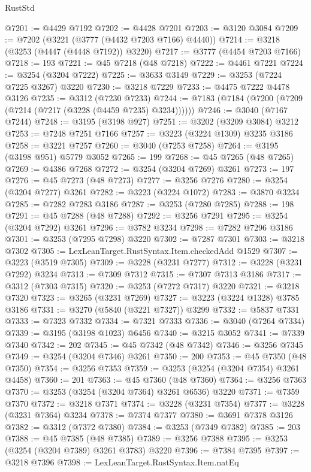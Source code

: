 \begin{lexlean}{RustStd}
\begin{coremodule}
@7201 := @4429 @7192
@7202 := @4428 @7201
@7203 := @3120 @3084
@7209 := @7202 (@3221 (@3777 (@4432 @7203 @7166) @4440))
@7214 := @3218 (@3253 (@4447 (@4448 @7192)) @3220)
@7217 := @3777 (@4454 @7203 @7166)
@7218 := 193
@7221 := @45 @7218 (@48 @7218)
@7222 := @4461 @7221
@7224 := @3254 (@3204 @7222)
@7225 := @3633 @3149
@7229 := @3253 (@7224 @7225 @3267) @3220
@7230 := @3218 @7229
@7233 := @4475 @7222 @4478 @3126
@7235 := @3312 (@7230 @7233)
@7244 := @7183 (@7184 (@7200 (@7209 (@7214 (@7217 (@3228 (@4459 @7235) @3234))))))
@7246 := @3040 (@7167 @7244)
@7248 := @3195 (@3198 @927)
@7251 := @3202 (@3209 @3084) @3212
@7253 := @7248 @7251 @7166
@7257 := @3223 (@3224 @1309) @3235 @3186
@7258 := @3221 @7257
@7260 := @3040 (@7253 @7258)
@7264 := @3195 (@3198 @951) @5779 @3052
@7265 := 199
@7268 := @45 @7265 (@48 @7265)
@7269 := @4386 @7268
@7272 := @3254 (@3204 @7269) @3261
@7273 := 197
@7276 := @45 @7273 (@48 @7273)
@7277 := @3256 @7276
@7280 := @3254 (@3204 @7277) @3261
@7282 := @3223 (@3224 @1072)
@7283 := @3870 @3234
@7285 := @7282 @7283 @3186
@7287 := @3253 (@7280 @7285)
@7288 := 198
@7291 := @45 @7288 (@48 @7288)
@7292 := @3256 @7291
@7295 := @3254 (@3204 @7292) @3261
@7296 := @3782 @3234
@7298 := @7282 @7296 @3186
@7301 := @3253 (@7295 @7298) @3220
@7302 := @7287 @7301
@7303 := @3218 @7302
@7305 := LexLeanTarget.RustSyntax.Item.checkedAdd @1529
@7307 := @3223 (@3519 @7305)
@7309 := @3228 (@3231 @7277)
@7312 := @3228 (@3231 @7292) @3234
@7313 := @7309 @7312
@7315 := @7307 @7313 @3186
@7317 := @3312 (@7303 @7315)
@7320 := @3253 (@7272 @7317) @3220
@7321 := @3218 @7320
@7323 := @3265 (@3231 @7269)
@7327 := @3223 (@3224 @1328) @3785 @3186
@7331 := @3270 (@5840 (@3221 @7327)) @3299
@7332 := @5837 @7331
@7333 := @7323 @7332
@7334 := @7321 @7333
@7336 := @3040 (@7264 @7334)
@7339 := @3195 (@3198 @1023) @6456
@7340 := @3215 @3052
@7341 := @7339 @7340
@7342 := 202
@7345 := @45 @7342 (@48 @7342)
@7346 := @3256 @7345
@7349 := @3254 (@3204 @7346) @3261
@7350 := 200
@7353 := @45 @7350 (@48 @7350)
@7354 := @3256 @7353
@7359 := @3253 (@3254 (@3204 @7354) @3261 @4458)
@7360 := 201
@7363 := @45 @7360 (@48 @7360)
@7364 := @3256 @7363
@7370 := @3253 (@3254 (@3204 @7364) @3261 @6536) @3220
@7371 := @7359 @7370
@7372 := @3218 @7371
@7374 := @3228 (@3231 @7354)
@7377 := @3228 (@3231 @7364) @3234
@7378 := @7374 @7377
@7380 := @3691 @7378 @3126
@7382 := @3312 (@7372 @7380)
@7384 := @3253 (@7349 @7382)
@7385 := 203
@7388 := @45 @7385 (@48 @7385)
@7389 := @3256 @7388
@7395 := @3253 (@3254 (@3204 @7389) @3261 @3783) @3220
@7396 := @7384 @7395
@7397 := @3218 @7396
@7398 := LexLeanTarget.RustSyntax.Item.natEq

\end{coremodule}
\end{lexlean}
